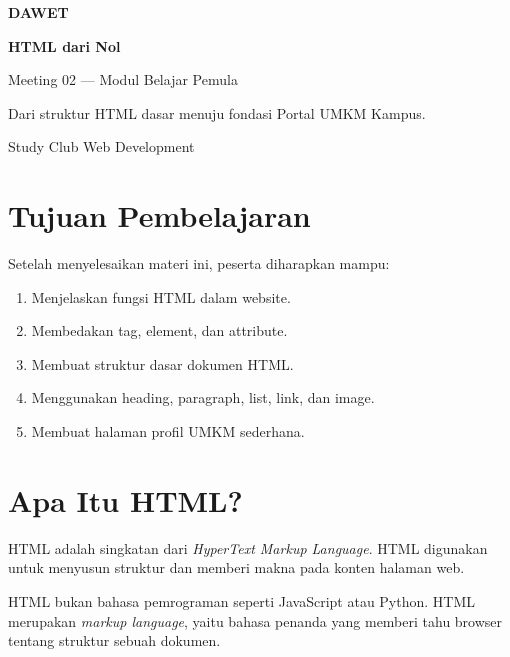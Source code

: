 \documentclass[11pt,a4paper]{article}
\begin{document}
\begin{titlepage}
    \centering
    \vspace*{3cm}
    {\Huge\bfseries\color{Navy} DAWET\par}
    \vspace{0.5cm}
    {\Huge\bfseries\color{Blue} HTML dari Nol\par}
    \vspace{0.7cm}
    {\Large Meeting 02 — Modul Belajar Pemula\par}
    \vspace{1.5cm}
    \begin{tcolorbox}[colback=Light,colframe=Mint,arc=3mm]
        \centering
        Dari struktur HTML dasar menuju fondasi Portal UMKM Kampus.
    \end{tcolorbox}
    \vfill
    {\large Study Club Web Development\par}
\end{titlepage}

\tableofcontents
\newpage

\section{Tujuan Pembelajaran}

Setelah menyelesaikan materi ini, peserta diharapkan mampu:

\begin{enumerate}[label=\arabic*.]
    \item Menjelaskan fungsi HTML dalam website.
    \item Membedakan tag, element, dan attribute.
    \item Membuat struktur dasar dokumen HTML.
    \item Menggunakan heading, paragraph, list, link, dan image.
    \item Membuat halaman profil UMKM sederhana.
\end{enumerate}

\section{Apa Itu HTML?}

HTML adalah singkatan dari \textit{HyperText Markup Language}. HTML digunakan untuk menyusun struktur dan memberi makna pada konten halaman web.

HTML bukan bahasa pemrograman seperti JavaScript atau Python. HTML merupakan \textit{markup language}, yaitu bahasa penanda yang memberi tahu browser tentang struktur sebuah dokumen.
\end{document}
